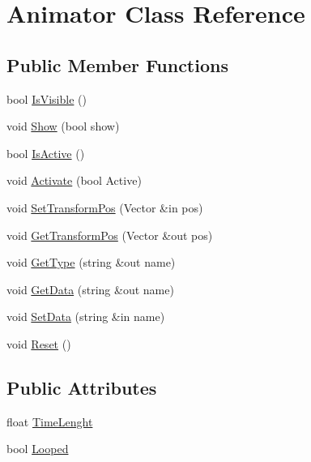 \hypertarget{class_animator}{}\section{Animator Class Reference}
\label{class_animator}
\subsection*{Public Member Functions}
\begin{DoxyCompactItemize}
\item 
bool \hyperlink{class_animator_a488b4b9cb26862e1a42246ef84d74ce5}{Is\+Visible} ()
\item 
void \hyperlink{class_animator_a2f550a3be2954440f927c9525c835dd7}{Show} (bool show)
\item 
bool \hyperlink{class_animator_a148a35b4c15123c7fcbe50c2b9327aa0}{Is\+Active} ()
\item 
void \hyperlink{class_animator_a0356da392e1c8e4506d547a9840f755b}{Activate} (bool Active)
\item 
void \hyperlink{class_animator_af014e225bedc9ebab69601959fbfe8f4}{Set\+Transform\+Pos} (Vector \&in pos)
\item 
void \hyperlink{class_animator_a2a0fdefbe031f918dd1ea5503a2f770d}{Get\+Transform\+Pos} (Vector \&out pos)
\item 
void \hyperlink{class_animator_a4b4566e439e855df6e58e73d60e91e4b}{Get\+Type} (string \&out name)
\item 
void \hyperlink{class_animator_aa1d32092436576c0cc3fc97048cac2d0}{Get\+Data} (string \&out name)
\item 
void \hyperlink{class_animator_adfe6040e5d819aa50794b21caed8dbc1}{Set\+Data} (string \&in name)
\item 
void \hyperlink{class_animator_a1cc8d341473488a6a68c7972e26871e8}{Reset} ()
\end{DoxyCompactItemize}
\subsection*{Public Attributes}
\begin{DoxyCompactItemize}
\item 
float \hyperlink{class_animator_ab8beb1a0bb60e00f3d0f473fd46f386d}{Time\+Lenght}
\item 
bool \hyperlink{class_animator_ab711ada9ead963f5fb863294a3819924}{Looped}
\end{DoxyCompactItemize}


